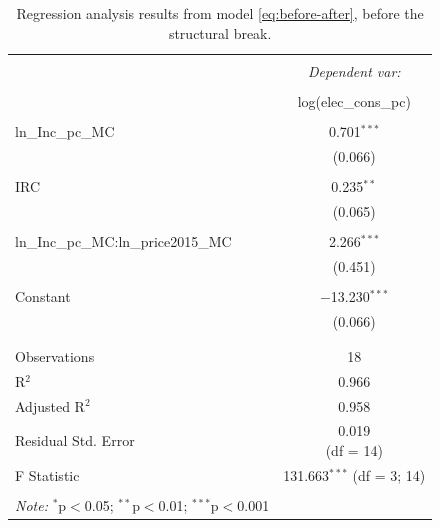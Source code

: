 \begin{table}[!htbp] \centering 
    \caption{Regression analysis results from model \eqref{eq:before-after}, before the structural break.} 
    \label{regression_before} 
  \begin{tabular}{@{\extracolsep{0pt}}lc} 
  \\[-1.8ex]\hline 
  \hline \\[-1.8ex] 
   & \multicolumn{1}{c}{\textit{Dependent var:}} \\ 
  \cline{2-2} 
  \\[-1.8ex] & log(elec\_cons\_pc) \\ 
  \hline \\[-1.8ex] 
   ln\_Inc\_pc\_MC & 0.701$^{***}$ \\ 
    & (0.066) \\ 
    & \\ 
   IRC & 0.235$^{**}$ \\ 
    & (0.065) \\ 
    & \\ 
   ln\_Inc\_pc\_MC:ln\_price2015\_MC & 2.266$^{***}$ \\ 
    & (0.451) \\ 
    & \\ 
   Constant & $-$13.230$^{***}$ \\ 
    & (0.066) \\ 
    & \\ 
  \hline \\[-1.8ex] 
  Observations & 18 \\ 
  R$^{2}$ & 0.966 \\ 
  Adjusted R$^{2}$ & 0.958 \\ 
  Residual Std. Error & \makecell{0.019 \\ (df = 14)} \\ 
  F Statistic & \makecell{131.663$^{***}$ \\ (df = 3; 14)} \\ 
  \hline 
  \hline \\[-1.8ex] 
  \textit{Note:} $^{*}$p$<$0.05; $^{**}$p$<$0.01; $^{***}$p$<$0.001 & \multicolumn{1}{r}{} \\ 
  \end{tabular} 
  \end{table} 
  
